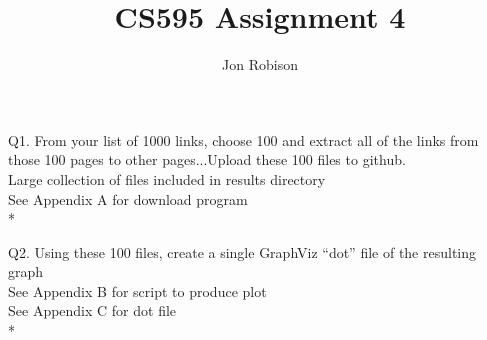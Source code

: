 \documentclass{article}
\begin{document}
\author{Jon Robison}
\title{CS595 Assignment 4}
\maketitle

Q1. From your list of 1000 links, choose 100 and extract all of the links from
those 100 pages to other pages...Upload these 100 files to github. \\
Large collection of files included in results directory \\
See Appendix A for download program
\\*

Q2. Using these 100 files, create a single GraphViz ``dot'' file of the resulting
graph \\
See Appendix B for script to produce plot \\
See Appendix C for dot file
\\*
\end{document}
